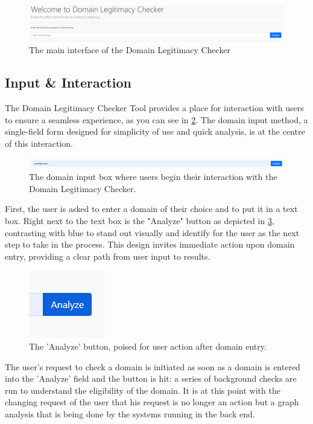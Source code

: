 \begin{figure}[H]
    \centering
    \includegraphics[width=1.1\linewidth]{project/image.png}
    \caption{The main interface of the Domain Legitimacy Checker}
    \label{fig:implem22}
\end{figure}

\subsection{Input \& Interaction}

 The Domain Legitimacy Checker Tool provides a place for interaction with users to ensure a seamless experience, as you can see in \ref{fig:impl2}. The domain input method, a single-field form designed for simplicity of use and quick analysis, is at the centre of this interaction.
 
\begin{figure} [H]
    \centering
    \includegraphics[width=1.1\linewidth]{project/6.png}
    \caption{The domain input box where users begin their interaction with the Domain Legitimacy Checker.}
    \label{fig:impl2}
\end{figure}

First, the user is asked to enter a domain of their choice and to put it in a text box. Right next to the text box is the "Analyze" button as depicted in \ref{fig:imple2222}, contrasting with blue to stand out visually and identify for the user as the next step to take in the process. This design invites immediate action upon domain entry, providing a clear path from user input to results.

\begin{figure}[H]
    \centering
    \includegraphics[width=0.1\linewidth]{project/8.png}
    \caption{The 'Analyze' button, poised for user action after domain entry.}
    \label{fig:imple2222}
\end{figure}

The user's request to check a domain is initiated as soon as a domain is entered into the 'Analyze' field and the button is hit: a series of background checks are run to understand the eligibility of the domain. It is at this point with the changing request of the user that his request is no longer an action but a graph analysis that is being done by the systems running in the back end.

